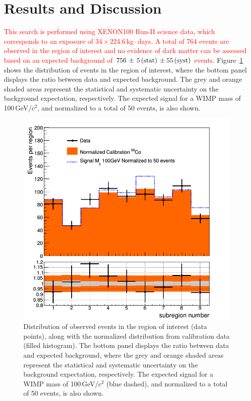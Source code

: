 \section{Results and Discussion}
\label{sec:results}

\textcolor{red} {This search is performed using XENON100 Run-II science data, which corresponds to an exposure of 34\,$\times$\,224.6\,kg\,$\cdot$\,days. 
A total of 764 events are observed in the region of interest and no evidence of dark matter can be assessed based on an expected background of
$756 \, \pm \, 5 \,{\rm (stat)} \, \pm 55\, {\rm (syst)}$ events. }
Figure~\ref{fig:dataVSbkg} shows the distribution of  events  in the region of interest, where the bottom panel displays the ratio
between data and expected background. The grey and orange shaded areas represent the statistical and systematic uncertainty 
on the background expectation, respectively. The expected signal for a WIMP mass of 100\,GeV/c$^2$, and normalized to a total of 50 events, is also shown.


\begin{figure}[t!]
  \includegraphics[width=\linewidth]{images/data_vs_bkg.png}
  \caption{Distribution of  observed events  in the region of interest (data points), along with the normalized distribution from calibration data (filled histogram). The bottom panel displays the ratio
between data and expected background, where the grey and orange shaded areas represent the statistical and systematic uncertainty 
on the background expectation, respectively. The expected signal for a WIMP mass of 100\,GeV/c$^2$ (blue dashed), and normalized to a total of 50 events, is also shown.}
  \label{fig:dataVSbkg}
\end{figure}

